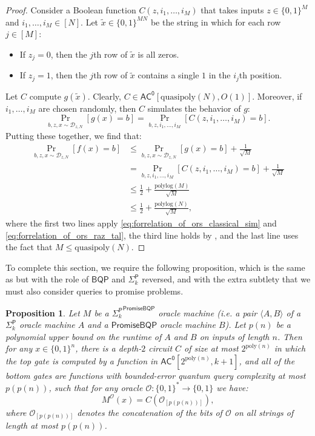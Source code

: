 \documentclass[10pt,a4paper]{article}
\newtheorem{proposition}[theorem]{Proposition}
\newcommand{\poly}{\mathrm{poly}}
\newcommand{\polylog}{\mathrm{polylog}}
\newcommand{\quasipoly}{\mathrm{quasipoly}}
\begin{document}
\begin{proof}
Consider a Boolean function $C(z, i_1,\ldots,i_M)$ that takes inputs $z \in \{0,1\}^M$ and $i_1,\ldots,i_M \in [N]$. Let $\tilde{x} \in \{0,1\}^{MN}$ be the string in which for each row $j \in [M]$:
\begin{itemize}
\item If $z_j = 0$, then the $j$th row of $\tilde{x}$ is all zeros.
\item If $z_j = 1$, then the $j$th row of $\tilde{x}$ contains a single $1$ in the $i_j$th position.
\end{itemize}
Let $C$ compute $g(\tilde{x})$. Clearly, $C \in \mathsf{AC^0}[\quasipoly(N), O(1)]$. Moreover, if $i_1,\ldots,i_M$ are chosen randomly, then $C$ simulates the behavior of $g$:
\begin{equation}
\label{eq:forrelation_of_ors_raz_tal}
\Pr_{b,z,x \sim \mathcal{D}_{z,N}} \left[g(x) = b \right] = \Pr_{b,z,i_1,\ldots,i_M}\left[C(z, i_1,\ldots,i_M) = b\right].
\end{equation}
Putting these together, we find that:
\begin{align*}
\Pr_{b,z,x \sim \mathcal{D}_{z,N}} \left[f(x) = b \right] &\le \Pr_{b,z,x \sim \mathcal{D}_{z,N}} \left[g(x) = b \right] + \frac{1}{\sqrt{M}}\\
&= \Pr_{b,z,i_1,\ldots,i_M}\left[C(z, i_1,\ldots,i_M) = b\right] + \frac{1}{\sqrt{M}}\\
&\le \frac{1}{2} + \frac{\polylog(M)}{\sqrt{M}}\\
&\le \frac{1}{2} + \frac{\polylog(N)}{\sqrt{M}},
\end{align*}
where the first two lines apply \eqref{eq:forrelation_of_ors_classical_sim} and \eqref{eq:forrelation_of_ors_raz_tal}, the third line holds by , and the last line uses the fact that $M \le \quasipoly(N)$.
\end{proof}

To complete this section, we require the following proposition, which is the same as  but with the role of $\mathsf{BQP}$ and $\mathsf{\Sigma}_k^\mathsf{P}$ reversed, and with the extra subtlety that we must also consider queries to promise problems.

\begin{proposition}
\label{prop:fss_ph^promisebqp}
Let $M$ be a ${\mathsf{\Sigma}_k^\mathsf{P}}^\mathsf{PromiseBQP}$ oracle machine (i.e. a pair $\langle A, B \rangle$ of a $\mathsf{\Sigma}_k^\mathsf{P}$ oracle machine $A$ and a $\mathsf{PromiseBQP}$ oracle machine $B$). Let $p(n)$ be a polynomial upper bound on the runtime of $A$ and $B$ on inputs of length $n$. Then for any $x \in \{0,1\}^n$, there is a depth-$2$ circuit $C$ of size at most $2^{\poly(n)}$ in which the top gate is computed by a function in $\mathsf{AC^0}\left[2^{\poly(n)}, k+1\right]$, and all of the bottom gates are functions with bounded-error quantum query complexity at most $p(p(n))$, such that for any oracle $\mathcal{O}: \{0,1\}^* \to \{0,1\}$ we have:
\[
M^\mathcal{O}(x) = C\left( \mathcal{O}_{[p(p(n))]} \right),
\]
where $\mathcal{O}_{[p(p(n))]}$ denotes the concatenation of the bits of $\mathcal{O}$ on all strings of length at most $p(p(n))$.
\end{proposition}
\end{document}
